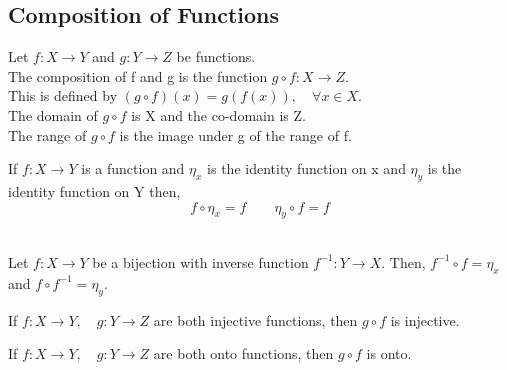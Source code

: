  \subsection{Composition of Functions}
 Let \(f: X\to Y\) and \(g: Y\to Z\) be functions.\\
 The composition of f and g is the function \(g\circ f: X\to Z\).\\
 This is defined by \((g\circ f)(x) = g(f(x)), \quad \forall x \in X\).\\
 The domain of \(g\circ f\) is X and the co-domain is Z.\\
 The range of \(g\circ f\) is the image under g of the range of f.\\
 \begin{theorm}
     If \(f: X\to Y\) is a function and \(\eta_x\) is the identity function on x and \(\eta_y\) is the identity function on Y then, \[f\circ \eta_x = f \qquad \eta_y\circ f = f\]\\
 \end{theorm}
 \begin{theorm}
     Let \(f: X\to Y\) be a bijection with inverse function \(f^{-1}: Y\to X\). Then, \(f^{-1}\circ f = \eta_x\) and \(f\circ f^{-1} = \eta_y\).\\
 \end{theorm}
 \begin{theorm}
     If \(f: X\to Y, \quad g:Y\to Z\) are both injective functions, then \(g\circ f\) is injective.\\
 \end{theorm}
 \begin{theorm}
    If \(f: X\to Y, \quad g:Y\to Z\) are both onto functions, then \(g\circ f\) is onto.\\     
 \end{theorm}
